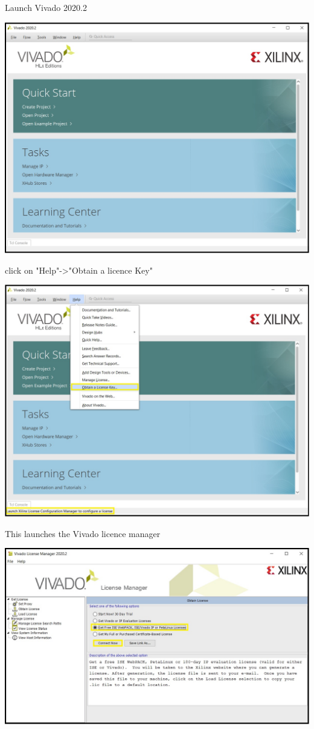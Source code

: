 Launch Vivado 2020.2

\includegraphics[width=\linewidth]{images/VivadoInstimg021.jpg}

click on "Help"->"Obtain a licence Key"

\includegraphics[width=\linewidth]{images/VivadoInstimg022.jpg}

This launches the Vivado licence manager

\includegraphics[width=\linewidth]{images/VivadoInstimg023.jpg}

